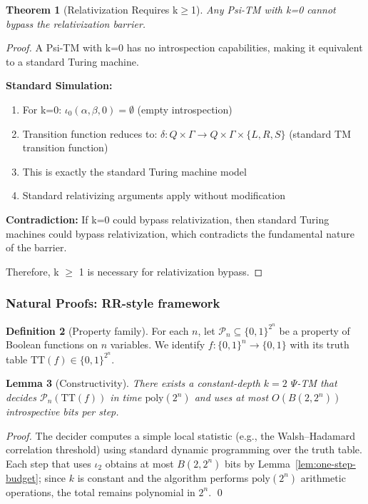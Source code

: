 \documentclass[11pt]{article}
\newtheorem{theorem}{Theorem}[section]
\newtheorem{lemma}[theorem]{Lemma}
\theoremstyle{definition}
\newtheorem{definition}[theorem]{Definition}
\newcommand{\PSi}{\Psi}
\newcommand{\bits}{\{0,1\}}
\begin{document}
\begin{theorem}[Relativization Requires k$\geq$1]
\label{thm:relativization-k0}
Any Psi-TM with k=0 cannot bypass the relativization barrier.
\end{theorem}

\begin{proof}
A Psi-TM with k=0 has no introspection capabilities, making it equivalent to a standard Turing machine.

\textbf{Standard Simulation:}
\begin{enumerate}
\item For k=0: $\iota_0(\alpha, \beta, 0) = \emptyset$ (empty introspection)
\item Transition function reduces to: $\delta: Q \times \Gamma \to Q \times \Gamma \times \{L, R, S\}$ (standard TM transition function)
\item This is exactly the standard Turing machine model
\item Standard relativizing arguments apply without modification
\end{enumerate}

\textbf{Contradiction:} If k=0 could bypass relativization, then standard Turing machines could bypass relativization, which contradicts the fundamental nature of the barrier.

Therefore, k $\geq$ 1 is necessary for relativization bypass.
\end{proof}

\subsubsection{Natural Proofs: RR-style framework}
\label{sec:natural-rr}

\begin{definition}[Property family]
For each $n$, let $\mathcal{P}_n\subseteq \{0,1\}^{2^n}$ be a property of Boolean functions on $n$ variables. We identify $f:\bits^n\to\bits$ with its truth table $\mathrm{TT}(f)\in\bits^{2^n}$.
\end{definition}

\begin{lemma}[Constructivity]
There exists a constant-depth $k=2$ $\PSi$-TM that decides $\mathcal{P}_n(\mathrm{TT}(f))$ in time $\mathrm{poly}(2^n)$ and uses at most $O(B(2,2^n))$ introspective bits per step.
\end{lemma}
\begin{proof}
The decider computes a simple local statistic (e.g., the Walsh–Hadamard correlation threshold) using standard dynamic programming over the truth table. Each step that uses $\iota_2$ obtains at most $B(2,2^n)$ bits by Lemma~\ref{lem:one-step-budget}; since $k$ is constant and the algorithm performs $\mathrm{poly}(2^n)$ arithmetic operations, the total remains polynomial in $2^n$. \qed
\end{proof}
\end{document}
